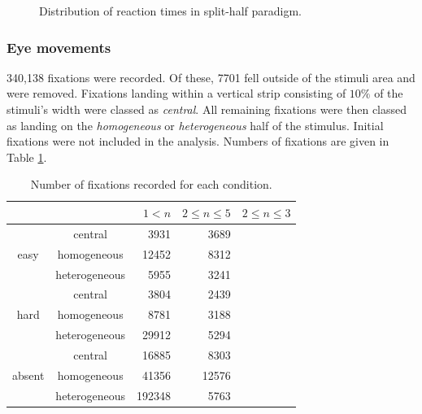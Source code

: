 \documentclass[a4paper, oneside, 11pt, onecolumn]{article}
\begin{document}
\begin{figure}
\centering
{}
\caption{Distribution of reaction times in split-half paradigm.}
\label{fig:splithalf_rt_dists_all}
\end{figure}

\subsubsection{Eye movements}

340,138 fixations were recorded. Of these, 7701 fell outside of the stimuli area and were removed. Fixations landing within a vertical strip consisting of $10\%$ of the stimuli's width were classed as \textit{central}. All remaining fixations were then classed as landing on the \textit{homogeneous} or \textit{heterogeneous} half of the stimulus. Initial fixations were not included in the analysis. Numbers of fixations are given in Table \ref{tab:num_fix}.

\begin{table}
\centering
\small
\begin{tabular}{c|c|r|r|r}
 		&	& $1<n$	& $2 \leq n \leq 5$ & $2 \leq n \leq 3$\\
\hline
\multirow{3}{*}{easy} 
& central		& 3931 	& 3689	& \\
& homogeneous 	& 12452	& 8312 	&\\
& heterogeneous & 5955	& 3241 	&\\
\hline
\multirow{3}{*}{hard} 
& central		& 3804 	& 2439	& \\
& homogeneous 	& 8781	& 3188	&	\\
& heterogeneous & 29912	& 5294	&\\
\hline
\multirow{3}{*}{absent} 
& central		& 16885 & 8303	& \\
& homogeneous 	& 41356	& 12576	&\\
& heterogeneous & 192348& 5763	&\\
\hline


\end{tabular}
\caption{Number of fixations recorded for each condition.}
\label{tab:num_fix}
\end{table}
\end{document}
